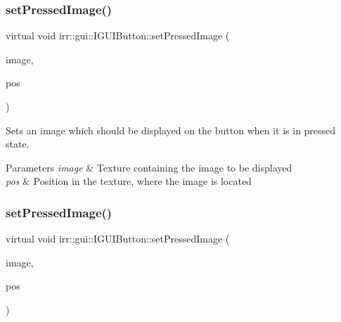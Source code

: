 \subsubsection{\texorpdfstring{set\+Pressed\+Image()}{setPressedImage()}\hspace{0.1cm}{\footnotesize\ttfamily [3/4]}}
{\footnotesize\ttfamily virtual void irr\+::gui\+::\+I\+G\+U\+I\+Button\+::set\+Pressed\+Image (\begin{DoxyParamCaption}\item[{\hyperlink{classirr_1_1video_1_1ITexture}{video\+::\+I\+Texture} $\ast$}]{image,  }\item[{const \hyperlink{classirr_1_1core_1_1rect}{core\+::rect}$<$ \hyperlink{namespaceirr_ac66849b7a6ed16e30ebede579f9b47c6}{s32} $>$ \&}]{pos }\end{DoxyParamCaption})\hspace{0.3cm}{\ttfamily [pure virtual]}}



Sets an image which should be displayed on the button when it is in pressed state. 


\begin{DoxyParams}{Parameters}
{\em image} & Texture containing the image to be displayed \\
\hline
{\em pos} & Position in the texture, where the image is located \\
\hline
\end{DoxyParams}
\mbox{\label{classirr_1_1gui_1_1IGUIButton_a08019647ec3e08984d795b3c564d457e}} 
\subsubsection{\texorpdfstring{set\+Pressed\+Image()}{setPressedImage()}\hspace{0.1cm}{\footnotesize\ttfamily [4/4]}}
{\footnotesize\ttfamily virtual void irr\+::gui\+::\+I\+G\+U\+I\+Button\+::set\+Pressed\+Image (\begin{DoxyParamCaption}\item[{\hyperlink{classirr_1_1video_1_1ITexture}{video\+::\+I\+Texture} $\ast$}]{image,  }\item[{const \hyperlink{classirr_1_1core_1_1rect}{core\+::rect}$<$ \hyperlink{namespaceirr_ac66849b7a6ed16e30ebede579f9b47c6}{s32} $>$ \&}]{pos }\end{DoxyParamCaption})\hspace{0.3cm}{\ttfamily [pure virtual]}}



